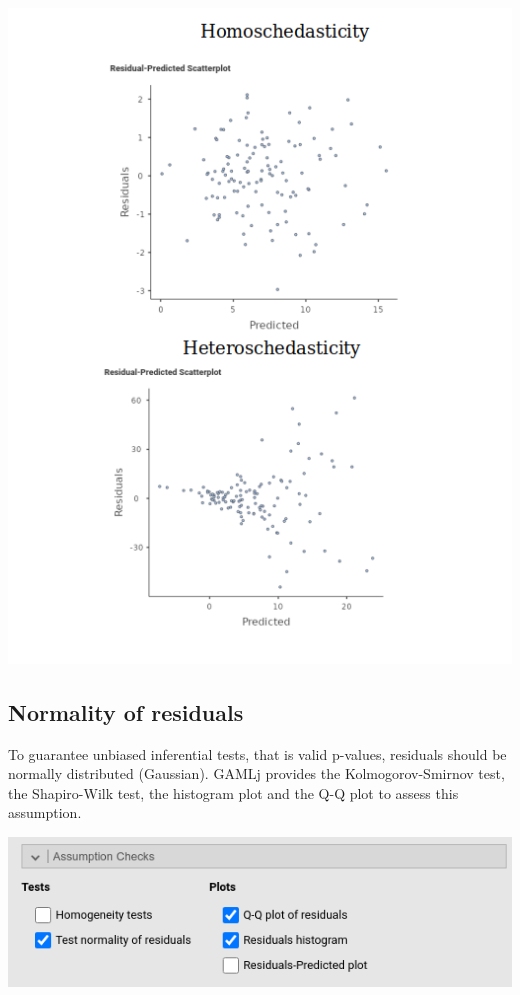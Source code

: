 \documentclass[
]{book}
\begin{document}
\includegraphics[width=7.1in]{bookletpics/2_assumptions_output2}

\hypertarget{normality-of-residuals}{%
\subsection{Normality of residuals}\label{normality-of-residuals}}

To guarantee unbiased inferential tests, that is valid p-values, residuals should be normally distributed (Gaussian). {GAMLj} provides the Kolmogorov-Smirnov test, the Shapiro-Wilk test, the histogram plot and the Q-Q plot to assess this assumption.

\includegraphics[width=7.79in]{bookletpics/2_assumptions_input3}
\end{document}
